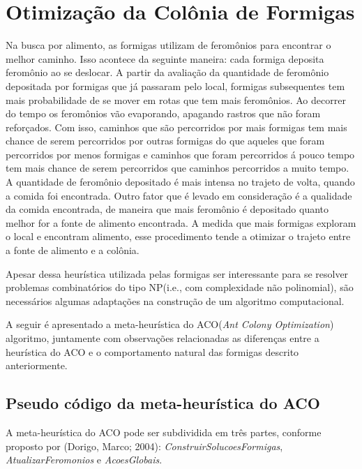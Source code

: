 \section{Otimização da Colônia de Formigas}

Na busca por alimento, as formigas utilizam de feromônios para encontrar o melhor caminho.
Isso acontece da seguinte maneira: cada formiga deposita feromônio ao se deslocar. A partir
da avaliação da quantidade de feromônio depositada por formigas que já passaram pelo local,
formigas subsequentes tem mais probabilidade de se mover em rotas que tem mais feromônios. Ao
decorrer do tempo os feromônios vão evaporando, apagando rastros que não foram reforçados. 
Com isso, caminhos que são percorridos por mais formigas tem mais chance de serem 
percorridos por outras formigas do que aqueles que foram percorridos por menos formigas e 
caminhos que foram percorridos á pouco tempo tem mais chance de serem percorridos que caminhos
percorridos a muito tempo. A quantidade de feromônio depositado é mais intensa no trajeto de volta,
quando a comida foi encontrada. Outro fator que é levado em consideração é a qualidade da comida
encontrada, de maneira que mais feromônio é depositado quanto melhor for a fonte de alimento encontrada.
A medida que mais formigas exploram o local e encontram alimento, esse procedimento tende a otimizar o
trajeto entre a fonte de alimento e a colônia.

Apesar dessa heurística utilizada pelas formigas ser interessante para se resolver problemas combinatórios 
do tipo NP(i.e., com complexidade não polinomial), são necessários algumas adaptações na construção
de um algoritmo computacional.

A seguir é apresentado a meta-heurística do ACO(\textit{Ant Colony Optimization}) algoritmo, juntamente com observações relacionadas as diferenças
entre a heurística do ACO e o comportamento natural das formigas descrito anteriormente.

\subsection{Pseudo código da meta-heurística do ACO}
% 
%
A meta-heurística do ACO pode ser subdividida em três partes, 
conforme proposto por (Dorigo, Marco; 2004): \textit{ConstruirSolucoesFormigas}, 
\textit{AtualizarFeromonios} e \textit{AcoesGlobais}.

